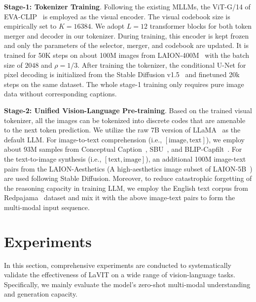 \textbf{Stage-1: Tokenizer Training}. Following the existing MLLMs, the ViT-G/14 of EVA-CLIP~\citep{fang2023eva} is employed as the visual encoder. The visual codebook size is empirically set to $K=16384$.  We adopt $L=12$ transformer blocks for both token merger and decoder in our tokenizer. During training, this encoder is kept frozen and only the parameters of the selector, merger, and codebook are updated. It is trained for 50K steps on about 100M images from LAION-400M~\citep{schuhmann2021laion} with the batch size of $2048$ and $\rho=1/3$. After training the tokenizer, the conditional U-Net for pixel decoding is initialized from the Stable Diffusion v1.5~\citep{rombach2022high} and finetuned 20k steps on the same dataset. The whole stage-1 training only requires pure image data without corresponding captions.

\textbf{Stage-2: Unified Vision-Language Pre-training}. 
Based on the trained visual tokenizer, all the images can be tokenized into discrete codes that are amenable to the next token prediction. We utilize the raw 7B version of LLaMA~\citep{touvron2023llama} as the default LLM. For image-to-text comprehension (i.e., $[\text{image}, \text{text}]$), we employ about 93M samples from Conceptual Caption~\citep{sharma2018conceptual,changpinyo2021conceptual}, SBU~\citep{ordonez2011im2text}, and BLIP-Capfilt~\citep{li2022blip}. For the text-to-image synthesis (i.e., $[\text{text}, \text{image}]$), an additional 100M image-text pairs from the LAION-Aesthetics (A high-aesthetics image subset of LAION-5B~\citep{schuhmann2022laion}) are used following Stable Diffusion. Moreover, to reduce catastrophic forgetting of the reasoning capacity in training LLM, we employ the English text corpus from Redpajama~\citep{together2023redpajama} dataset and mix it with the above image-text pairs to form the multi-modal input sequence. 

\vspace{-0.1in}

\section{Experiments}
\label{sec:exp}
In this section, comprehensive experiments are conducted to systematically validate the effectiveness of LaVIT on a wide range of vision-language tasks. Specifically, we mainly evaluate the model's zero-shot multi-modal understanding and generation capacity. 

